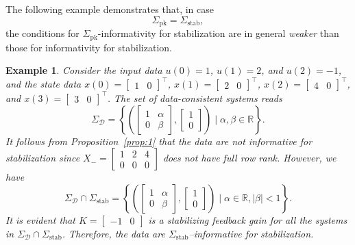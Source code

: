 \documentclass[10pt,a4paper]{amsart}
\newcommand{\set}[2]{\left\{#1 \mid #2\right\}}
\newtheorem{example}[theorem]{Example}
\begin{document}
The following example demonstrates that, in case
\begin{equation}
\label{eq:pk=stab}
\Sigma_\text{pk}=\Sigma_\text{stab},
\end{equation}
the conditions for $\Sigma_\text{pk}$-informativity for stabilization are in general \emph{weaker} than those for informativity for stabilization.

\begin{example}
\label{ex:1}
Consider the input data $u(0)=1$, \mbox{$u(1)=2$}, and $u(2)=-1$, and the state data $x(0)=\begin{bmatrix}
1 & 0
\end{bmatrix}^\top$, \mbox{$x(1)=\begin{bmatrix}
2 & 0
\end{bmatrix}^\top$}, $x(2)=\begin{bmatrix}
4 & 0
\end{bmatrix}^\top$, and $x(3)=\begin{bmatrix}
3 & 0
\end{bmatrix}^\top$. The set of data-consistent systems reads
\begin{equation}
\Sigma_\mathcal{D}=\set{\left(\begin{bmatrix}
1 & \alpha \\
0 & \beta
\end{bmatrix},\begin{bmatrix}
1 \\ 0
\end{bmatrix}\right)}{\alpha,\beta\in\mathbb{R}}.
\end{equation}
It follows from Proposition~\ref{prop:1} that the data are not informative for stabilization since $X_-=\begin{bmatrix}
1 & 2 & 4 \\
0 & 0 & 0
\end{bmatrix}$ does not have full row rank. However, we have
\begin{equation}
\Sigma_\mathcal{D}\cap\Sigma_\text{stab}=\set{\left(\begin{bmatrix}
1 & \alpha \\
0 & \beta
\end{bmatrix},\begin{bmatrix}
1 \\ 0
\end{bmatrix}\right)}{\alpha\in\mathbb{R},|\beta|<1}.
\end{equation}
It is evident that $K=\begin{bmatrix}
-1 & 0
\end{bmatrix}$ is a stabilizing feedback gain for all the systems in \mbox{$\Sigma_\mathcal{D}\cap\Sigma_\text{stab}$}. Therefore, the data are \mbox{$\Sigma_\text{stab}$--informative} for stabilization. 
\end{example}
\end{document}
